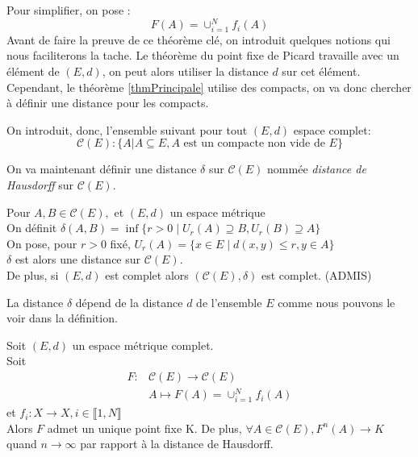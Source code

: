 \documentclass[a4paper, 12pt]{report}
\begin{document}
			Pour simplifier, on pose :
			\begin{equation*}
				F(A)=\cup^N_{i=1}f_i(A)
			\end{equation*}
			\hspace{.7 cm} Avant de faire la preuve de ce théorème clé, on introduit quelques notions qui nous faciliterons la tache. Le théorème du point fixe de Picard travaille avec un élément de $(E,d)$, on peut alors utiliser la distance $d$ sur cet élément. Cependant, le théorème \ref{thmPrincipale} utilise des compacts, on va donc chercher à définir une distance pour les compacts.
			
			On introduit, donc, l'ensemble suivant pour tout $(E,d)$ espace complet:
			\begin{equation*}
				\mathcal{C}(E) : \{A|A\subseteq E, A\textrm{ est un compacte non vide de }E\}
			\end{equation*}
			
			\hspace{.7 cm}On va maintenant définir une distance $\delta$ sur $\mathcal{C}(E)$ nommée \textit{distance de Hausdorff} sur $\mathcal{C}(E)$.
			\begin{prop}
				\label{mesHauss}
				Pour $A,B\in\mathcal{C}(E),$ et $(E,d)$ un espace métrique\\
				On définit $\delta(A,B)=\inf\{r>0\mid U_r(A)\supseteq B, U_r(B)\supseteq A\}$\\
				On pose, pour $r>0$ fixé, $U_r(A)=\{x\in E\mid d(x,y)\leq r,y\in A\}$\\
				$\delta$ est alors une distance sur $\mathcal{C}(E)$.\\
				De plus, si $(E,d)$ est complet alors $(\mathcal{C}(E),\delta)$ est complet. (ADMIS)
			\end{prop}
			\begin{remark*}
				La distance $\delta$ dépend de la distance $d$ de l'ensemble $E$ comme nous pouvons le voir dans la définition. 
			\end{remark*}


			
			
			\begin{theorem}
			\label{ThmConverge}
				Soit $(E,d)$ un espace métrique complet.\\
				Soit 
				\begin{align*}
					F:&\mathcal{C}(E)\longrightarrow \mathcal{C}(E)\\
					&A\longmapsto F(A)=\cup^N_{i=1}f_i(A)
				\end{align*}
				et $f_i:X \longrightarrow X, i\in\llbracket 1,N\rrbracket$\\
				Alors $F$ admet un unique point fixe K. De plus, $\forall A\in\mathcal{C}(E), F^n(A)\longrightarrow K$ quand ${n\to\infty}$ par rapport à la distance de Hausdorff.
			\end{theorem}
\end{document}
